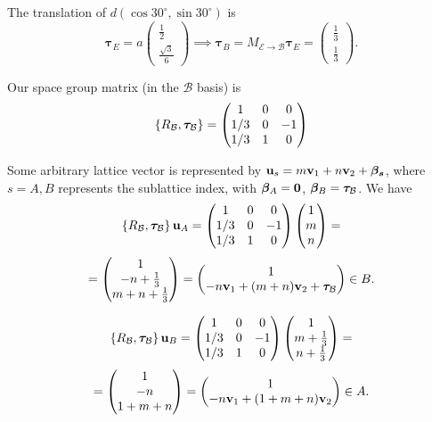 The translation of $d(\cos 30^\circ, \sin 30^\circ)$ is
$$
\bm{\tau}_E = a \begin{pmatrix} \frac{1}{2} \\ \frac{\sqrt{3}}{6} \end{pmatrix} \implies
\bm{\tau}_B = M_{\mathcal{E} \to \mathcal{B}} \bm{\tau}_E =
\begin{pmatrix}
\frac{1}{3} \\ \frac{1}{3}
\end{pmatrix}.
$$

Our space group matrix (in the $\mathcal{B}$ basis) is
$$
\{R_{\mathcal{B}}, {\bm{\tau}}_{\mathcal{B}}\} =
\begin{pmatrix}
1 & 0 & 0 \\
1/3 & 0 & -1 \\
1/3 & 1 & 0 \\
\end{pmatrix}
$$

Some arbitrary lattice vector is represented by ${\vb{u}}_s = m {\vb{v}}_1 + n{\vb{v}}_2 + \bm{\beta_s}$, where $s = A, B$ represents the sublattice index, with $\bm{\beta}_A = {\vb{0}}$, $\bm{\beta}_B = {\bm{\tau}}_{\mathcal{B}}$. We have
$$
\{R_{\mathcal{B}}, {\bm{\tau}}_{\mathcal{B}}\} \, {\vb{u}}_A =
\begin{pmatrix}
1 & 0 & 0 \\
1/3 & 0 & -1 \\
1/3 & 1 & 0 \\
\end{pmatrix}
\begin{pmatrix}
1 \\ m \\ n
\end{pmatrix}
=
$$
$$
=
\begin{pmatrix}
1 \\ -n + \frac{1}{3} \\ m+n+\frac{1}{3}
\end{pmatrix}
=
\begin{pmatrix}
1 \\ -n {\vb{v}}_1 + (m+n) {\vb{v}}_2 + {\bm{\tau}}_{\mathcal{B}}
\end{pmatrix}
\in B.
$$

$$
\{R_{\mathcal{B}}, {\bm{\tau}}_{\mathcal{B}}\} \, {\vb{u}}_B =
\begin{pmatrix}
1 & 0 & 0 \\
1/3 & 0 & -1 \\
1/3 & 1 & 0 \\
\end{pmatrix}
\begin{pmatrix}
1 \\ m + \frac{1}{3} \\ n + \frac{1}{3}
\end{pmatrix}
=
$$
$$
=
\begin{pmatrix}
1 \\ -n \\ 1+m+n
\end{pmatrix}
=
\begin{pmatrix}
1 \\ -n {\vb{v}}_1 + (1+m+n) {\vb{v}}_2
\end{pmatrix}
\in A.
$$

